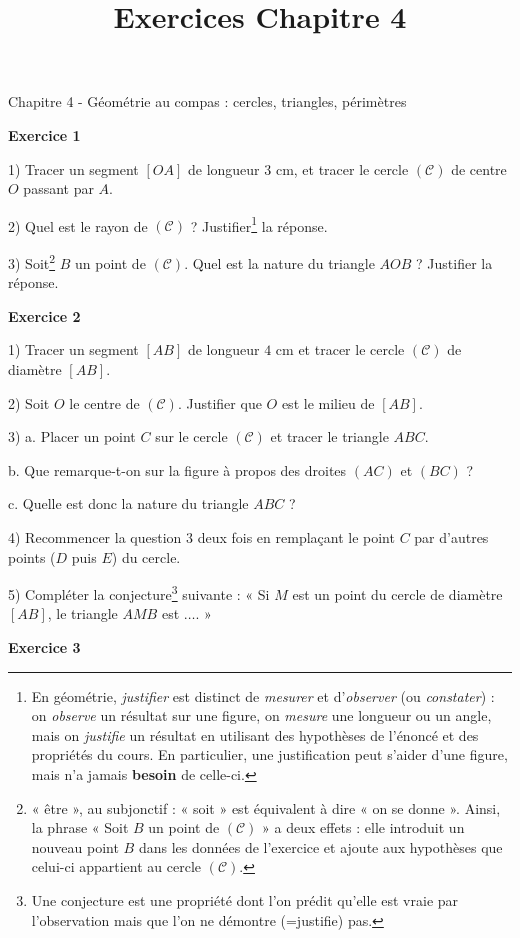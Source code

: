 \documentclass[12 pt]{article}
\title{Exercices Chapitre 4}
\date{}
\theoremstyle{plain}
\newcounter{n}
\numberwithin{n}{section}
\begin{document}
\begin{center}{\Large Chapitre 4 - Géométrie au compas : cercles, triangles, périmètres}\\ 
 \end{center}


\textbf{Exercice 1}

1) Tracer un segment $[OA]$ de longueur $3$ cm, et tracer le cercle $(\mathcal C)$ de centre $O$ passant par $A$.

2) Quel est le rayon de $({\mathcal C})$ ? Justifier\footnote{En géométrie, \emph{justifier} est distinct de \emph{mesurer} et d'\emph{observer} (ou \emph{constater}) : 
on \emph{observe} un résultat sur une figure, on \emph{mesure} une longueur ou un angle, 
mais on \emph{justifie} un résultat en utilisant des hypothèses de l'énoncé et des propriétés du cours. En particulier, une justification peut s'aider d'une figure, mais n'a jamais \textbf{besoin} de celle-ci.} la réponse. 

3) Soit\footnote{« être », au subjonctif : « soit » est équivalent à dire « on se donne ». Ainsi, la phrase « Soit $B$ un point de $(\mathcal C)$ » a deux effets : elle introduit un nouveau point $B$ dans les données de l'exercice 
et ajoute aux hypothèses que celui-ci appartient au cercle $(\mathcal C)$.} $B$ un point de $(\mathcal C)$. 
Quel est la nature du triangle $AOB$ ? Justifier la réponse. 

\textbf{Exercice 2}

1) Tracer un segment $[AB]$ de longueur $4$ cm et tracer le cercle $(\mathcal C)$ de diamètre $[AB]$. 

2) Soit $O$ le centre de $(\mathcal C)$. Justifier que $O$ est le milieu de $[AB]$. 

3) a. Placer un point $C$ sur le cercle $(\mathcal C)$ et tracer le triangle $ABC$.
 
b. Que remarque-t-on sur la figure à propos des droites $(AC)$ et $(BC)$ ? 

c. Quelle est donc la nature du triangle $ABC$ ? 

4) Recommencer la question $3$ deux fois en remplaçant le point $C$ par d'autres points ($D$ puis $E$) du cercle. 

5) Compléter la conjecture\footnote{Une conjecture est une propriété dont l'on prédit qu'elle est vraie par 
l'observation mais que l'on ne démontre (=justifie) pas.} suivante : « Si $M$ est un point du cercle de diamètre $[AB]$,
le triangle $AMB$ est $\ldots$. »

\textbf{Exercice 3}
\end{document}
